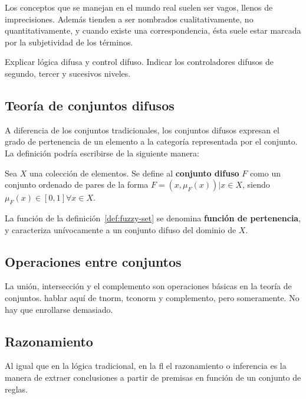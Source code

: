Los conceptos que se manejan en el mundo real suelen ser vagos, llenos de imprecisiones. Además tienden a ser nombrados cualitativamente, no quantitativamente, y cuando existe una correspondencia, ésta suele estar marcada por la subjetividad de los términos.

Explicar lógica difusa y control difuso. Indicar los controladores difusos de segundo, tercer y sucesivos niveles.

\subsection{Teoría de conjuntos difusos}

A diferencia de los conjuntos tradicionales, los conjuntos difusos expresan el grado de pertenencia de un elemento a la categoría representada por el conjunto. La definición podría escribirse de la siguiente manera:


\begin{definition}
	Sea $X$ una colección de elementos. Se define al \textbf{conjunto difuso} $F$ como un conjunto ordenado de pares de la forma $F = {(x, \mu_F(x)) | x \in X}$, siendo $\mu_F(x) \in [0, 1] \forall x \in X$.
	\label{def:fuzzy-set}
\end{definition}

La función de la definición~\ref{def:fuzzy-set} se denomina \textbf{función de pertenencia}, y caracteriza unívocamente a un conjunto difuso del dominio de $X$.


\subsection{Operaciones entre conjuntos}

La unión, intersección y el complemento son operaciones básicas en la teoría de conjuntos. \TODO hablar aquí de tnorm, tconorm y complemento, pero someramente. No hay que enrollarse demasiado.

\subsection{Razonamiento}

Al igual que en la lógica tradicional, en la \gls{fl} el razonamiento o inferencia es la manera de extraer conclusiones a partir de premisas en función de un conjunto de reglas.

